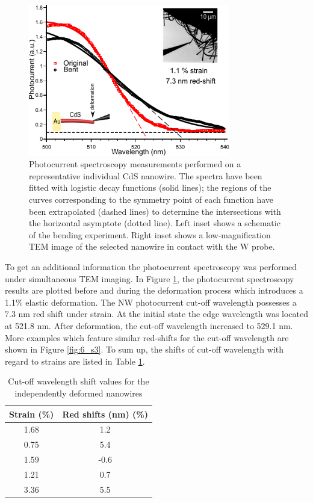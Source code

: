 \begin{figure}  
\centering
\includegraphics[width=250pt]{figures/figure6_4}
\caption[Photocurrent spectroscopy of deformed CdS NW]
{Photocurrent spectroscopy measurements performed on a representative individual CdS nanowire. The spectra have been fitted with logistic decay functions (solid lines); the regions of the curves corresponding to the symmetry point of each function have been extrapolated (dashed lines) to determine the intersections with the horizontal asymptote (dotted line). 
Left inset shows a schematic of the bending experiment. Right inset shows a low-magnification TEM image of the selected nanowire in contact with the W probe. 
\label{fig:6_4}}
\end{figure}

To get an additional information the photocurrent spectroscopy was performed under simultaneous TEM imaging. 
In Figure \ref{fig:6_4}, the photocurrent spectroscopy results are plotted before and during the deformation process which introduces a 1.1\% elastic deformation.
The NW photocurrent cut-off wavelength possesses a 7.3 nm red shift under strain. At the initial state the edge wavelength was located at 521.8 nm. After deformation, the cut-off wavelength increased to 529.1 nm. 
More examples which feature similar red-shifts for the cut-off wavelength are shown in Figure \ref{fig:6_s3}. 
To sum up, the shifts of cut-off wavelength with regard to strains are listed in Table \ref{tab:6_1}. 

\begin{table}
    \centering
    \begin{tabular}{c|c}
    \hline
         Strain (\%) & Red shifts (nm) (\%)\\
         \hline
         1.68 & 1.2\\
         0.75 & 5.4\\
         1.59 & -0.6\\
         1.21 & 0.7\\
         3.36 & 5.5\\
         \hline
    \end{tabular}
    \caption{Cut-off wavelength shift values for the independently deformed nanowires}
    \label{tab:6_1}
\end{table}

